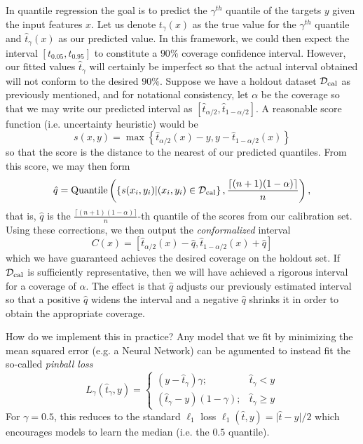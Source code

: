 In quantile regression the goal is to predict the $\gamma^{th}$ quantile of the targets $y$ given the input features $x$. Let us denote $t_\gamma(x)$ as the true value for the $\gamma^{th}$ quantile and $\hat{t}_\gamma(x)$ as our predicted value. In this framework, we could then expect the interval $[t_{0.05}, t_{0.95}]$ to constitute a $90\%$ coverage confidence interval. However, our fitted values $\hat{t}_\gamma$ will certainly be imperfect so that the actual interval obtained will not conform to the desired $90\%$. Suppose we have a holdout dataset $\mathcal{D}_{\text{cal}}$ as previously mentioned, and for notational consistency, let $\alpha$ be the coverage so that we may write our predicted interval as $[\hat{t}_{\alpha/2}, \hat{t}_{1-\alpha/2}]$. A reasonable score function (i.e. uncertainty heuristic) would be
\begin{equation}
  s(x,y) = \max\left\{\hat{t}_{\alpha/2}(x)-y, y-\hat{t}_{1-\alpha/2}(x) \right\}
\end{equation}
so that the score is the distance to the nearest of our predicted quantiles. From this score, we may then form
\begin{equation}
  \hat{q} = \text{Quantile}\left(\left\{ s(x_i,y_i) \vert (x_i,y_i)\in\mathcal{D}_{\text{cal}}\right\}, \frac{\lceil (n+1)(1-\alpha) \rceil}{n}\right),
\end{equation}
that is, $\hat{q}$ is the  $\frac{\lceil (n+1)(1-\alpha) \rceil}{n}$-th quantile of the scores from our calibration set. Using these corrections, we then output the \textit{conformalized} interval
\begin{equation}
  C(x) = \left[ \hat{t}_{\alpha/2}(x)-\hat{q}, \hat{t}_{1-\alpha/2}(x)+\hat{q} \right]
\end{equation}
which we have guaranteed achieves the desired coverage on the holdout set. If $\mathcal{D}_{\text{cal}}$ is sufficiently representative, then we will have achieved a rigorous interval for a coverage of $\alpha$. The effect is that $\hat{q}$ adjusts our previously estimated interval so that a positive $\hat{q}$ widens the interval and a negative $\hat{q}$ shrinks it in order to obtain the appropriate coverage.

How do we implement this in practice? Any model that we fit by minimizing the mean squared error (e.g. a Neural Network) can be agumented to instead fit the so-called \textit{pinball loss}
\begin{equation}
  L_\gamma(\hat{t}_{\gamma}, y) = \begin{cases}
    (y-\hat{t}_{\gamma})\gamma; & \hat{t}_{\gamma} < y \\
    (\hat{t}_{\gamma}-y)(1-\gamma); & \hat{t}_{\gamma} \geq y
    \end{cases}
\end{equation}
For $\gamma=0.5$, this reduces to the standard $\ell_1$ loss $\ell_1(\hat{t},y) = \lvert \hat{t}-y\rvert/2$ which encourages models to learn the median (i.e. the $0.5$ quantile).

